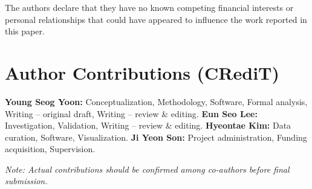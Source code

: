 \documentclass[preprint,10pt]{elsarticle}
\begin{document}
The authors declare that they have no known competing financial interests or personal relationships that could have appeared to influence the work reported in this paper.


\section*{Author Contributions (CRediT)}

\textbf{Young Seog Yoon:} Conceptualization, Methodology, Software, Formal analysis, Writing -- original draft, Writing -- review \& editing.
\textbf{Eun Seo Lee:} Investigation, Validation, Writing -- review \& editing.
\textbf{Hyeontae Kim:} Data curation, Software, Visualization.
\textbf{Ji Yeon Son:} Project administration, Funding acquisition, Supervision.

\noindent\textit{Note: Actual contributions should be confirmed among co-authors before final submission.}
\end{document}
